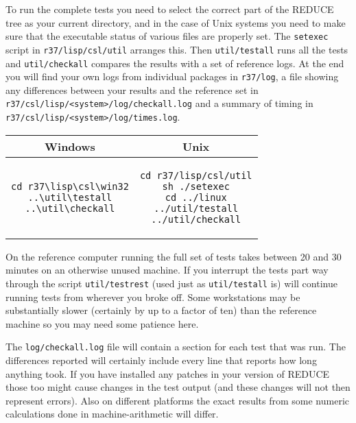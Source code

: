 \documentclass[a4paper,11pt]{article}
\begin{document}
To run the complete tests you need to select the correct part of the REDUCE
tree as your current directory, and in the case of Unix systems you need to
make sure that the executable status of various files are properly set. The
\verb+setexec+ script in \verb+r37/lisp/csl/util+ arranges this. Then
\verb+util/testall+ runs all the tests and \verb+util/checkall+ compares
the results with a set of reference logs. At the end you will find your
own logs from individual packages in \verb+r37/log+, a file showing any
differences between your results and the reference set in
\verb+r37/csl/lisp/<system>/log/checkall.log+ and a summary of timing in
\verb+r37/csl/lisp/<system>/log/times.log+.
\begin{center}
\begin{tabular}{|c|c|} \hline
Windows & Unix \\ \hline
\begin{minipage}{2.3in}
\begin{verbatim}
cd r37\lisp\csl\win32
..\util\testall
..\util\checkall
\end{verbatim}
\end{minipage} & \begin{minipage}{2.3in}
\begin{verbatim}
cd r37/lisp/csl/util
sh ./setexec
cd ../linux
../util/testall
../util/checkall
\end{verbatim}
\end{minipage} \\ \hline
\end{tabular}
\end{center}

On the reference computer running the full set of tests takes between 20
and 30 minutes on an otherwise unused machine. If you interrupt the tests
part way through the script \verb+util/testrest+ (used just as
\verb+util/testall+ is) will continue running tests from wherever you
broke off.  Some workstations may be substantially slower (certainly by up to a
factor of ten) than the reference machine so you may need some patience here.

The \verb+log/checkall.log+ file will contain a section for each test that
was run. The differences reported will certainly include every line that
reports how long anything took.  If you have installed any patches in your
version of REDUCE those too might cause changes in the test output (and these
changes will not then represent errors). Also on different platforms the
exact results from some numeric calculations done in machine-arithmetic will
differ.
\end{document}
